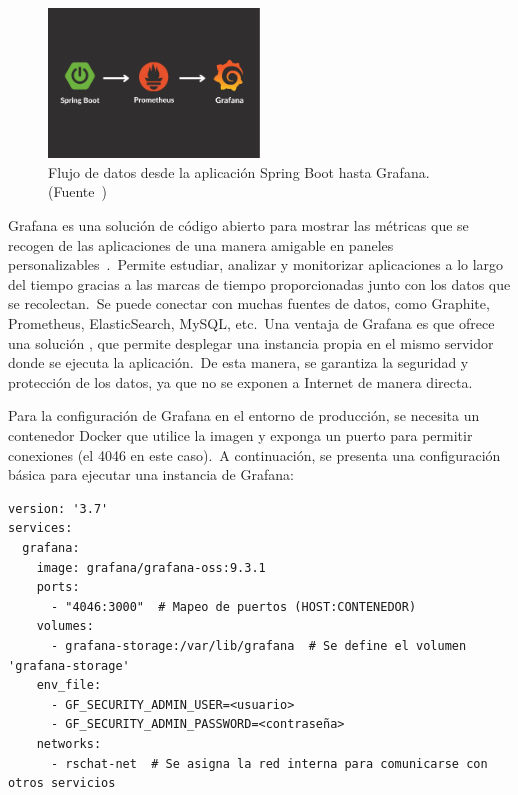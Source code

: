 \begin{figure}[H]
	\centering
	\includegraphics[width=0.5\textwidth]{res/images/cover}
	\caption{Flujo de datos desde la aplicación Spring Boot hasta Grafana. (Fuente~\cite{prometheus-flow})}
	\label{fig:prometheus-flow}
\end{figure}

Grafana es una solución de código abierto para mostrar las métricas que se recogen de las aplicaciones de una
manera amigable en paneles personalizables~\cite{what-is-grafana}.\ Permite estudiar, analizar y monitorizar
aplicaciones a lo largo del tiempo gracias a las marcas de tiempo proporcionadas junto con los datos que se
recolectan.\ Se puede conectar con muchas fuentes de datos, como Graphite, Prometheus, ElasticSearch, MySQL, etc.\
Una ventaja de Grafana es que ofrece una solución , que permite desplegar una instancia propia en
el mismo servidor donde se ejecuta la aplicación.\ De esta manera, se garantiza la seguridad y protección de los
datos, ya que no se exponen a Internet de manera directa.

Para la configuración de Grafana en el entorno de producción, se necesita un contenedor Docker que utilice la imagen
\monoFont{grafana/grafana-oss} y exponga un puerto para permitir conexiones (el 4046 en este caso).\ A continuación,
se presenta una configuración básica para ejecutar una instancia de Grafana:

\begin{codeBlock}
	\begin{verbatim}
version: '3.7'
services:
  grafana:
    image: grafana/grafana-oss:9.3.1
    ports:
      - "4046:3000"  # Mapeo de puertos (HOST:CONTENEDOR)
    volumes:
      - grafana-storage:/var/lib/grafana  # Se define el volumen 'grafana-storage'
    env_file:
      - GF_SECURITY_ADMIN_USER=<usuario>
      - GF_SECURITY_ADMIN_PASSWORD=<contraseña>
    networks:
      - rschat-net  # Se asigna la red interna para comunicarse con otros servicios
	\end{verbatim}
	\caption{Configuración mínima para ejecutar un contenedor con Grafana.}
	\label{cod:grafana-docker-compose}
\end{codeBlock}

